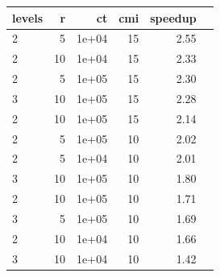 \begin{tabular}{l|rrrrr}
\hline
levels & r & ct & cmi & speedup \\
\hline
2 & 5 & 1e+04 & 15 & 2.55 \\
2 & 10 & 1e+04 & 15 & 2.33 \\
2 & 5 & 1e+05 & 15 & 2.30 \\
3 & 10 & 1e+05 & 15 & 2.28 \\
2 & 10 & 1e+05 & 15 & 2.14 \\
2 & 5 & 1e+05 & 10 & 2.02 \\
2 & 5 & 1e+04 & 10 & 2.01 \\
3 & 10 & 1e+05 & 10 & 1.80 \\
2 & 10 & 1e+05 & 10 & 1.71 \\
3 & 5 & 1e+05 & 10 & 1.69 \\
2 & 10 & 1e+04 & 10 & 1.66 \\
3 & 10 & 1e+04 & 10 & 1.42 \\
\hline
\end{tabular}

